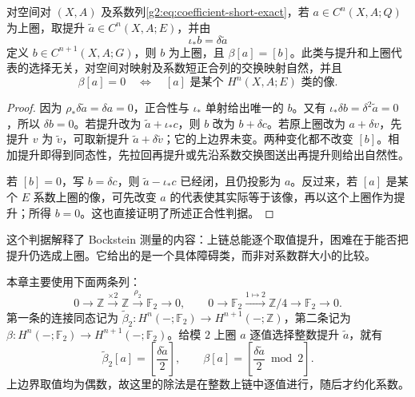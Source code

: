 \begin{proposition}\label{g2:prop:bockstein-cochain}
	对空间对 \((X,A)\) 及系数列\eqref{g2:eq:coefficient-short-exact}，若 \(a\in C^n(X,A;Q)\) 为上圈，取提升 \(\widetilde a\in C^n(X,A;E)\)，并由
	\[
		\iota_* b=\delta\widetilde a
	\]
	定义 \(b\in C^{n+1}(X,A;G)\)，则 \(b\) 为上圈，且 \(\beta[a]=[b]\)。此类与提升和上圈代表的选择无关，对空间对映射及系数短正合列的交换映射自然，并且
	\[
		\beta[a]=0\quad\Longleftrightarrow\quad[a]\text{ 是某个 }H^n(X,A;E)\text{ 类的像}.
	\]
\end{proposition}
\begin{proof}
	因为 \(\rho_*\delta\widetilde a=\delta a=0\)，正合性与 \(\iota_*\) 单射给出唯一的 \(b\)。又有 \(\iota_*\delta b=\delta^2\widetilde a=0\)，所以 \(\delta b=0\)。若提升改为 \(\widetilde a+\iota_*c\)，则 \(b\) 改为 \(b+\delta c\)。若原上圈改为 \(a+\delta v\)，先提升 \(v\) 为 \(\widetilde v\)，可取新提升 \(\widetilde a+\delta\widetilde v\)；它的上边界未变。两种变化都不改变 \([b]\)。相加提升即得到同态性，先拉回再提升或先沿系数交换图送出再提升则给出自然性。

	若 \([b]=0\)，写 \(b=\delta c\)，则 \(\widetilde a-\iota_*c\) 已经闭，且仍投影为 \(a\)。反过来，若 \([a]\) 是某个 \(E\) 系数上圈的像，可先改变 \(a\) 的代表使其实际等于该像，再以这个上圈作为提升；所得 \(b=0\)。这也直接证明了所述正合性判据。
\end{proof}

这个判据解释了 Bockstein 测量的内容：上链总能逐个取值提升，困难在于能否把提升仍选成上圈。它给出的是一个具体障碍类，而非对系数群大小的比较。

\ProseParagraphBreak

本章主要使用下面两条列：
\[
	0\longrightarrow\mathbb Z\xrightarrow{\times2}\mathbb Z\xrightarrow{\rho_2}\mathbb F_2\longrightarrow0,
	\qquad
	0\longrightarrow\mathbb F_2\xrightarrow{1\mapsto2}\mathbb Z/4\longrightarrow\mathbb F_2\longrightarrow0.
\]
第一条的连接同态记为 \(\widetilde\beta_2:H^n(-;\mathbb F_2)\to H^{n+1}(-;\mathbb Z)\)，第二条记为 \(\beta:H^n(-;\mathbb F_2)\to H^{n+1}(-;\mathbb F_2)\)。给模 \(2\) 上圈 \(a\) 逐值选择整数提升 \(\widetilde a\)，就有
\begin{equation}\label{g2:eq:bockstein-divide-two}
	\widetilde\beta_2[a]=\left[\frac{\delta\widetilde a}{2}\right],\qquad
	\beta[a]=\left[\frac{\delta\widetilde a}{2}\bmod2\right].
\end{equation}
上边界取值均为偶数，故这里的除法是在整数上链中逐值进行，随后才约化系数。

